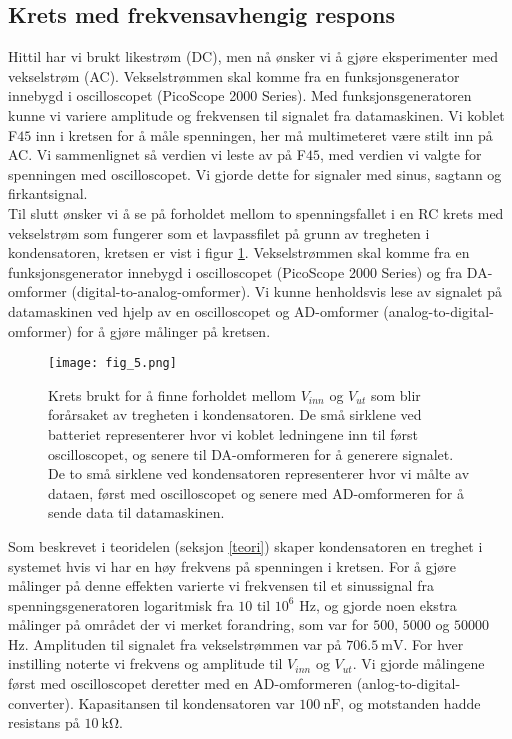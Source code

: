 \documentclass[%
 reprint,
nofootinbib,
aps,
]{revtex4-1}
\begin{document}
\subsection{Krets med frekvensavhengig respons}
Hittil har vi brukt likestrøm (DC), men nå ønsker vi å gjøre eksperimenter med vekselstrøm (AC). Vekselstrømmen skal komme fra en funksjonsgenerator innebygd i oscilloscopet (PicoScope 2000 Series). Med funksjonsgeneratoren kunne vi variere amplitude og frekvensen til signalet fra datamaskinen. Vi koblet F$45$ inn i kretsen for å måle spenningen, her må multimeteret være stilt inn på AC. Vi sammenlignet så verdien vi leste av på F$45$, med verdien vi valgte for spenningen med oscilloscopet. Vi gjorde dette for signaler med sinus, sagtann og firkantsignal. \\
Til slutt ønsker vi å se på forholdet mellom to spenningsfallet i en RC krets med vekselstrøm som fungerer som et lavpassfilet på grunn av tregheten i kondensatoren, kretsen er vist i figur \ref{fig5}. Vekselstrømmen skal komme fra en funksjonsgenerator innebygd i oscilloscopet (PicoScope 2000 Series) og fra DA-omformer (digital-to-analog-omformer). Vi kunne henholdsvis lese av signalet på datamaskinen ved hjelp av en oscilloscopet og AD-omformer (analog-to-digital-omformer) for å gjøre målinger på kretsen.
\begin{figure}[h!]
  \centering
  \texttt{[image: fig\_5.png]}
  \caption{Krets brukt for å finne forholdet mellom $V_{inn}$ og $V_{ut}$ som blir forårsaket av tregheten i kondensatoren. De små sirklene ved batteriet representerer hvor vi koblet ledningene inn til først oscilloscopet, og senere til DA-omformeren for å generere signalet. De to små sirklene ved kondensatoren representerer hvor vi målte av dataen, først med oscilloscopet og senere med AD-omformeren for å sende data til datamaskinen.}
  \label{fig5}
\end{figure}
Som beskrevet i teoridelen (seksjon \ref{teori}) skaper kondensatoren en treghet i systemet hvis vi har en høy frekvens på spenningen i kretsen. For å gjøre målinger på denne effekten varierte vi frekvensen til et sinussignal fra spenningsgeneratoren logaritmisk fra $10$ til $10^6$ Hz, og gjorde noen ekstra målinger på området der vi merket forandring, som var for $500$, $5000$ og $50000$ Hz. Amplituden til signalet fra vekselstrømmen var på $\SI{706.5}{\milli \volt}$. For hver instilling noterte vi frekvens og amplitude til $V_{inn}$ og $V_{ut}$. Vi gjorde målingene først med oscilloscopet deretter med en AD-omformeren (anlog-to-digital-converter). Kapasitansen til kondensatoren var $\SI{100}{\nano\farad}$, og motstanden hadde resistans på $\SI{10}{\kilo\ohm}$.
\end{document}

